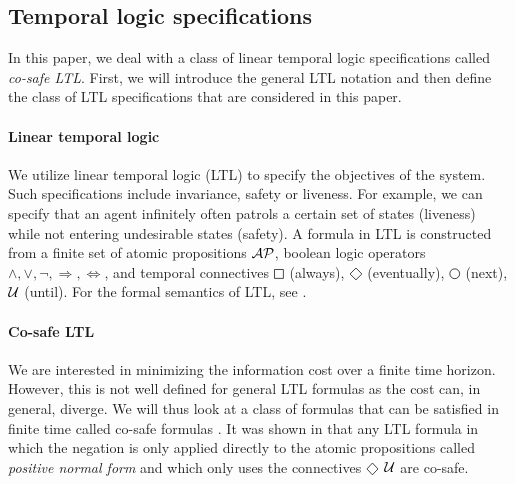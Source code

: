 \subsection{Temporal logic specifications} In this paper, we deal with a class of linear temporal logic specifications called \emph{co-safe LTL}. First, we will introduce the general LTL notation and then define the class of LTL specifications that are considered in this paper.

\paragraph*{Linear temporal logic} We utilize linear temporal logic (LTL) to specify the objectives of the system. Such specifications include invariance, safety or liveness. For example, we can specify that an agent infinitely often patrols a certain set of states (liveness) while not entering undesirable states (safety). A formula in LTL is constructed from a finite set of atomic propositions $\mathcal{AP}$, boolean logic operators $\wedge,\vee,\lnot,\Rightarrow,\Leftrightarrow$, and temporal connectives $\LTLsquare$ (always), $\LTLdiamond$ (eventually), $\LTLcircle$ (next), $\operatorname{\mathcal{U}}$ (until). For the formal semantics of LTL, see \cite{BaierKatoen08}.

\paragraph*{Co-safe LTL} We are interested in minimizing the information cost over a finite time horizon. However, this is not well defined for general LTL formulas as the cost can, in general, diverge. We will thus look at a class of formulas that can be satisfied in finite time called co-safe formulas \cite{keylist}. It was shown in \cite{Any} that any LTL formula in which the negation is only applied directly to the atomic propositions called \emph{positive normal form} and which only uses the connectives $\LTLdiamond$ $\operatorname{\mathcal{U}}$ are co-safe. 

